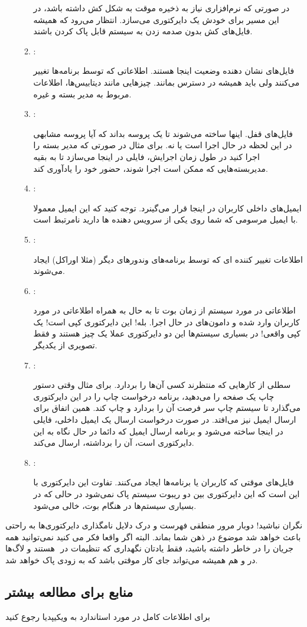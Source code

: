 \begin{enumerate}
\begin{enumerate}
در صورتی که نرم‌افزاری نیاز به ذخیره موقت به شکل کش داشته باشد، در این مسیر برای خودش یک دایرکتوری می‌سازد. انتظار می‌رود که همیشه فایل‌های کش بدون صدمه زدن به سیستم قابل پاک کردن باشند.
\item {\large{}}:

فایل‌های نشان دهنده وضعیت اینجا هستند. اطلاعاتی که توسط برنامه‌ها تغییر می‌کنند ولی باید همیشه در دسترس بمانند. چیزهایی مانند دیتابیس‌ها، اطلاعات مربوط به مدیر بسته و غیره.
\item {\large{}}:

فایل‌های قفل. اینها ساخته می‌شوند تا یک پروسه بداند که آیا پروسه مشابهی در این لحظه در حال اجرا است یا نه. برای مثال در صورتی که مدیر بسته
را اجرا کنید در طول زمان اجرایش، فایلی در اینجا می‌سازد تا به بقیه مدیربسته‌هایی که ممکن است اجرا شوند، حضور خود را یادآوری کند.
\item {\large{}}:

ایمیل‌های داخلی کاربران در اینجا قرار می‌گینرد. توجه کنید که این ایمیل معمولا با ایمیل مرسومی که شما روی یکی از سرویس دهنده ‌ها دارید نامرتبط است.
\item {\large{}}:

اطلاعات تغییر کننده ای که توسط برنامه‌های وندورهای دیگر (مثلا اوراکل) ایجاد می‌شوند.
\item {\large{}}:

اطلاعاتی در مورد سیستم از زمان بوت تا به حال به همراه اطلاعاتی در مورد کاربران وارد شده و دامون‌های در حال اجرا. بله! این دایرکتوری کپی
است! یک کپی واقعی! در بسیاری سیستم‌ها این دو دایرکتوری عملا یک چیز هستند و فقط تصویری از یکدیگر.
\item {\large{}}:

سطلی از کارهایی که منتظرند کسی آن‌ها را بردارد. برای مثال وقتی دستور چاپ یک صفحه را می‌دهید، برنامه درخواست چاپ را در این دایرکتوری می‌گذارد تا سیستم چاپ سر فرصت آن را بردارد و چاپ کند. همین اتفاق برای ارسال ایمیل نیز می‌افتد. در صورت درخواست ارسال یک ایمیل داخلی، فایلی در اینجا ساخته می‌شود و برنامه ارسال ایمیل که دائما در حال نگاه به این دایرکتوری است، آن را برداشته، ارسال می‌کند.
\item {\large{}}:

فایل‌های موقتی که کاربران یا برنامه‌ها ایجاد می‌کنند. تفاوت این دایرکتوری با 
 این است که این دایرکتوری بین دو ریبوت سیستم پاک نمی‌شود در حالی که 
 در بسیاری سیستم‌ها در هنگام بوت، خالی می‌شود.
\end{enumerate}
\end{enumerate}
نگران نباشید! دوبار مرور منطقی فهرست و درک دلایل نامگذاری دایرکتوری‌ها به راحتی باعث خواهد شد موضوع در ذهن شما بماند. البته اگر واقعا فکر می کنید نمی‌توانید همه جریان را در خاطر داشته باشید، فقط یادتان نگهداری که تنظیمات در ‌
 هستند و لاگ‌ها در 
 و 
 هم همیشه می‌تواند جای کار موقتی باشد که به زودی پاک خواهد شد.
\subsection*{منابع برای مطالعه بیشتر}
برای اطلاعات کامل در مورد استاندارد 
 به ویکیپدیا رجوع کنید
